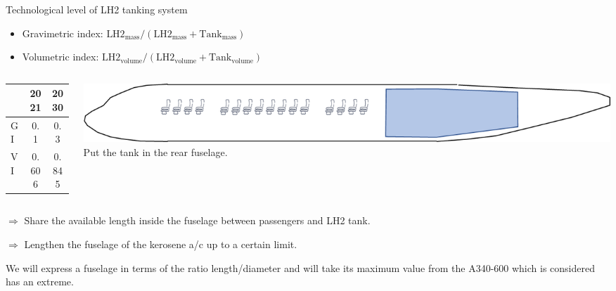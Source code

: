 \documentclass[aspectratio=169]{beamer}
\begin{document}
\begin{frame}{Technological level of LH2 tanking system}
    \begin{itemize}
        \item Gravimetric index: $\textrm{LH2}_{\textrm{mass}}/(\textrm{LH2}_{\textrm{mass}}+\textrm{Tank}_{\textrm{mass}})$
        \item Volumetric index: $\textrm{LH2}_{\textrm{volume}}/(\textrm{LH2}_{\textrm{volume}}+\textrm{Tank}_{\textrm{volume}})$
    \end{itemize}
    \begin{columns}
        \begin{column}{0.5\linewidth}
            \begin{table}
                \centering
                \begin{tabular}{lcc}
                    \toprule
                    & 2021 & 2030 \\
                    \midrule
                    GI & 0.1 & 0.3 \\
                    VI & 0.606 & 0.845 \\
                    \bottomrule
                \end{tabular}
                \label{tab:indices}
            \end{table}
        \end{column}
        \begin{column}{0.5\linewidth}
            \includegraphics[width=\linewidth]{lh2pac_1}\\
            Put the tank in the rear fuselage.
        \end{column}
    \end{columns}
    $\Rightarrow$ Share the available length inside the fuselage between passengers and LH2 tank.

    $\Rightarrow$ Lengthen the fuselage of the kerosene a/c up to a certain limit.

    We will express a fuselage in terms of the ratio length/diameter
    and will take its maximum value from the A340-600 which is considered has an extreme.
\end{frame}
\end{document}
